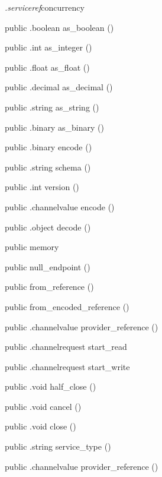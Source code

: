 \begin{CrexxClass}{\textit{.serviceref}}{concurrency}
\begin{Members}
    \Method
      {public}
      {.boolean}
      {as\_boolean}
      {()}

    \Method
      {public}
      {.int}
      {as\_integer}
      {()}

    \Method
      {public}
      {.float}
      {as\_float}
      {()}

    \Method
      {public}
      {.decimal}
      {as\_decimal}
      {()}

    \Method
      {public}
      {.string}
      {as\_string}
      {()}

    \Method
      {public}
      {.binary}
      {as\_binary}
      {()}

    \Method
      {public}
      {.binary}
      {encode}
      {()}

    \Method
      {public}
      {.string}
      {schema}
      {()}

    \Method
      {public}
      {.int}
      {version}
      {()}

    \Method
      {public}
      {.channelvalue}
      {encode}
      {()}

    \Method
      {public}
      {.object}
      {decode}
      {()}

    \Factory
      {public}
      {memory}
      {}

    \Factory
      {public}
      {null\_endpoint}
      {()}

    \Factory
      {public}
      {from\_reference}
      {()}

    \Factory
      {public}
      {from\_encoded\_reference}
      {()}

    \Method
      {public}
      {.channelvalue}
      {provider\_reference}
      {()}

    \Method
      {public}
      {.channelrequest}
      {start\_read}
      {}

    \Method
      {public}
      {.channelrequest}
      {start\_write}
      {}

    \Method
      {public}
      {.void}
      {half\_close}
      {()}

    \Method
      {public}
      {.void}
      {cancel}
      {()}

    \Method
      {public}
      {.void}
      {close}
      {()}

    \Method
      {public}
      {.string}
      {service\_type}
      {()}

    \Method
      {public}
      {.channelvalue}
      {provider\_reference}
      {()}

  \end{Members}
\end{CrexxClass}

